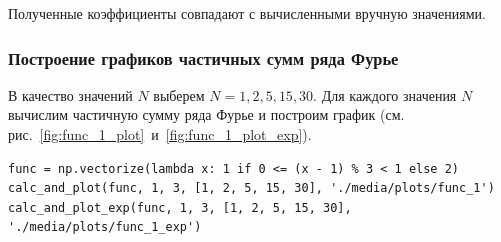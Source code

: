 Полученные коэффициенты совпадают с вычисленными вручную значениями.

\subsubsection{Построение графиков частичных сумм ряда Фурье}
В качество значений $N$ выберем $N = 1, 2, 5, 15, 30$. Для каждого значения $N$ вычислим частичную сумму ряда Фурье и построим график (см. рис.~\ref{fig:func_1_plot}~и~\ref{fig:func_1_plot_exp}).

\begin{lstlisting}[style=python_white, caption=Построение графиков частичных сумм ряда Фурье, label=lst:func_1_plot]
func = np.vectorize(lambda x: 1 if 0 <= (x - 1) % 3 < 1 else 2)
calc_and_plot(func, 1, 3, [1, 2, 5, 15, 30], './media/plots/func_1')
calc_and_plot_exp(func, 1, 3, [1, 2, 5, 15, 30], './media/plots/func_1_exp')
\end{lstlisting}

